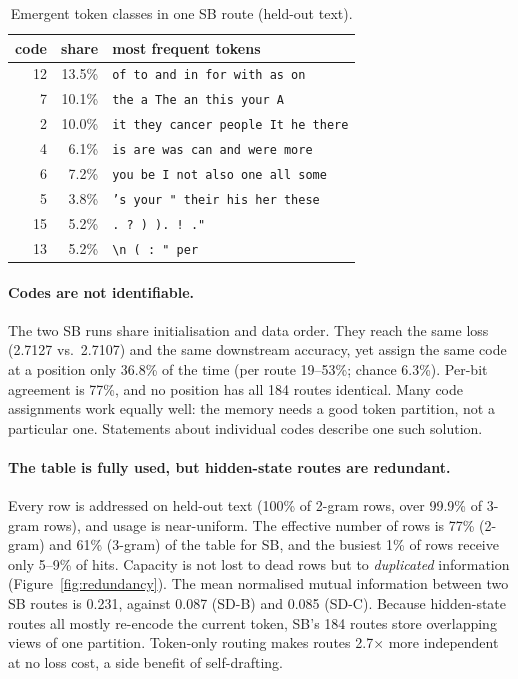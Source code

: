 \documentclass[11pt]{article}
\newcommand{\SB}{\textsc{SB}}
\newcommand{\SDB}{\textsc{SD-B}}
\newcommand{\SDC}{\textsc{SD-C}}
\begin{document}
\begin{table}[t]
\centering
\small
\setlength{\tabcolsep}{3pt}
\begin{tabular}{rrl}
\toprule
code & share & most frequent tokens \\
\midrule
12 & 13.5\% & \texttt{of to and in for with as on} \\
7 & 10.1\% & \texttt{the a The an this your A} \\
2 & 10.0\% & \texttt{it they cancer people It he there} \\
4 & 6.1\% & \texttt{is are was can and were more} \\
6 & 7.2\% & \texttt{you be I not also one all some} \\
5 & 3.8\% & \texttt{'s your " their his her these} \\
15 & 5.2\% & \texttt{. ? ) ). ! ."} \\
13 & 5.2\% & \texttt{\textbackslash n ( : " per} \\
\bottomrule
\end{tabular}
\caption{Emergent token classes in one \SB{} route (held-out text).}
\label{tab:pos}
\end{table}

\paragraph{Codes are not identifiable.}
The two \SB{} runs share initialisation and data order. They reach the same loss (2.7127 vs.\ 2.7107) and the same
downstream accuracy, yet assign the same code at a position only 36.8\% of the time (per route 19--53\%; chance 6.3\%).
Per-bit agreement is 77\%, and no position has all 184 routes identical. Many code assignments work equally well: the
memory needs a good token partition, not a particular one. Statements about individual codes describe one such solution.

\paragraph{The table is fully used, but hidden-state routes are redundant.}
Every row is addressed on held-out text (100\% of 2-gram rows, over 99.9\% of 3-gram rows), and usage is near-uniform.
The effective number of rows is 77\% (2-gram) and 61\% (3-gram) of the table for \SB, and the busiest 1\% of rows receive
only 5--9\% of hits. Capacity is not lost to dead rows but to \emph{duplicated} information (Figure~\ref{fig:redundancy}).
The mean normalised mutual information between two \SB{} routes is 0.231, against 0.087 (\SDB) and 0.085 (\SDC).
Because hidden-state routes all mostly re-encode the current token, \SB's 184 routes store overlapping views of one
partition. Token-only routing makes routes 2.7$\times$ more independent at no loss cost, a side benefit of
self-drafting.
\end{document}
